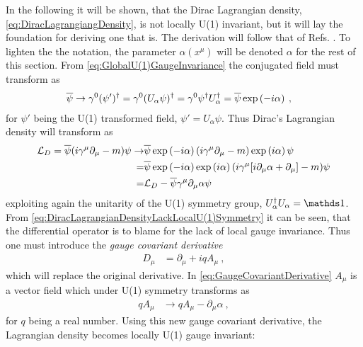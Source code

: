 \documentclass[../main.tex]{subfiles} %
\begin{document}
In the following it will be shown, that the Dirac Lagrangian density, \cref{eq:DiracLagrangiangDensity}, is not locally U(1) invariant, but it will lay the foundation for deriving one that is. The derivation will follow that of Refs. \cite{peskin_introToQFT_1995, griffiths_introToElementaryParticles_2008, panyella_masterThesis_2019}. To lighten the the notation, the parameter $\alpha(x^\mu)$ will be denoted $\alpha$ for the rest of this section. From \cref{eq:GlobalU(1)GaugeInvariance} the conjugated field must transform as
\begin{align}
    \psibar &\rightarrow \gamma^0 (\psi')\dagger
        = \gamma^0 (U_\alpha \psi)\dagger
        = \gamma^0\psi\dagger U_\alpha\dagger
        = \psibar\exp{-i\alpha} \: ,
\end{align}
for $\psi'$ being the U(1) transformed field, $\psi' = U_\alpha \psi$. Thus Dirac's Lagrangian density will transform as
\begin{align} \label{eq:DiracLagrangianDensityLackLocalU(1)Symmetry}
\begin{split}
    \L_D = \psibar (i \gamma^\mu \partial_\mu - m) \psi \rightarrow
        & \psibar \exp{-i\alpha} (i \gamma^\mu \partial_\mu - m) \exp{i\alpha} \psi \\
        =& \psibar \exp{-i\alpha} \exp{i\alpha} (i \gamma^\mu [i \partial_\mu \alpha + \partial_\mu] - m) \psi \\
        =& \L_D - \psibar\gamma^\mu \partial_\mu \alpha \psi
\end{split}
\end{align}
exploiting again the unitarity of the U(1) symmetry group, $U_\alpha\dagger U_\alpha = \id$. From \cref{eq:DiracLagrangianDensityLackLocalU(1)Symmetry} it can be seen, that the differential operator is to blame for the lack of local gauge invariance. Thus one must introduce the \emph{gauge covariant derivative}
\begin{align} \label{eq:GaugeCovariantDerivative}
    D_\mu &= \partial_\mu + iqA_\mu \: ,
\end{align}
which will replace the original derivative. In \cref{eq:GaugeCovariantDerivative} $A_\mu$ is a vector field which under U(1) symmetry transforms as
\begin{align}
    qA_\mu &\rightarrow qA_\mu - \partial_\mu\alpha \: ,
\end{align}
for $q$ being a real number. Using this new gauge covariant derivative, the Lagrangian density becomes locally U(1) gauge invariant:
\end{document}
